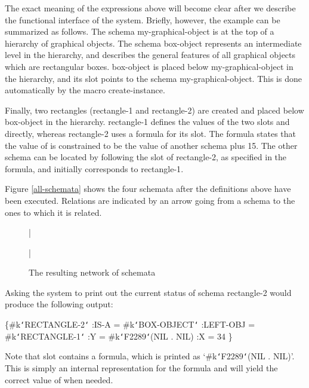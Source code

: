 The exact meaning of the expressions above will become clear after we
describe the functional interface of the system.  Briefly, however,
the example can be summarized as follows.  The schema
{\sc my-graphical-object} is at the top of a hierarchy of graphical
objects.  The schema {\sc box-object} represents an intermediate level
in the hierarchy, and describes the general features of all graphical
objects which are rectangular boxes.  {\sc box-object} is placed below
{\sc my-graphical-object} in the hierarchy, and its  slot
points to the schema {\sc my-graphical-object}.  This is done
automatically by the macro create-instance.

Finally, two rectangles ({\sc rectangle-1} and {\sc rectangle-2}) are
created and placed below {\sc box-object} in the hierarchy.  {\sc rectangle-1}
defines the values of the two slots  and  directly, whereas
{\sc rectangle-2} uses a formula for its  slot.  The formula states
that the value of  is constrained to be the  value of another
schema plus 15.  The other schema can be located by following the
 slot of {\sc rectangle-2}, as specified in the formula, and
initially corresponds to {\sc rectangle-1}.

Figure \ref{all-schemata} shows the four schemata after the definitions
above have been executed.  Relations are indicated by an arrow going from a
schema to the ones to which it is related.

\begin{figure}
\bar{}
\begin{center}
\end{center}
\caption{The resulting network of schemata}
\bar{}
\end{figure}


Asking the system to print out the
current status of schema {\sc rectangle-2} would produce the following output:
\begin{programexample}
\{\#k{\tt\char`\<}RECTANGLE-2{\tt\char`\>}
  :IS-A =  \#k{\tt\char`\<}BOX-OBJECT{\tt\char`\>}
  :LEFT-OBJ =  \#k{\tt\char`\<}RECTANGLE-1{\tt\char`\>}
  :Y =  \#k{\tt\char`\<}F2289{\tt\char`\>}(NIL . NIL)
  :X =  34
\}
\end{programexample}

Note that slot  contains a formula, which is printed as
`\#k{\tt\char`\<}F2289{\tt\char`\>}(NIL . NIL)'.  This is simply an internal representation for the
formula and will yield the correct value of  when needed.




